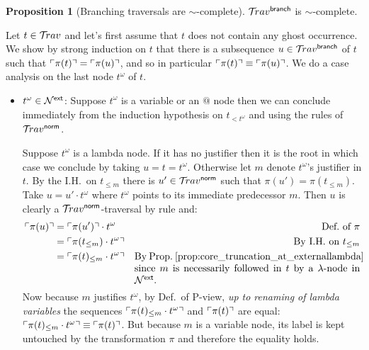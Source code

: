 \documentclass{article}
\theoremstyle{definition}
\newtheorem{proposition}{Proposition}[section]
\newcommand\Nodes{\mathcal{N}}%
\newcommand{\normalizing}{{\sf norm}}
\newcommand{\branching}{{\sf branch}}
\newcommand{\travsetbr}{{\travset^\branching}}
\newcommand{\travsetnorm}{\travset^\normalizing}
\newcommand{\travulc}{\travset}
\def\coresymbol{\pi} %
\newcommand{\core}[1]{\coresymbol(#1)} %
\newcommand{\ExtNodes}{\Nodes^{\sf ext}}
\begin{document}
\begin{proposition}[Branching traversals are $\sim$-complete]
\label{prop:branching_traversal_simcomplete}
  $\travsetbr$ is  $\sim$-complete.
\end{proposition}
\proofatend
Let $t\in\travulc$ and let's first assume that $t$ does not contain any ghost occurrence. We show by strong induction on $t$ that there is a subsequence $u\in\travsetbr$ of $t$ such that $\pview{\core{t}} = \pview{\core{u}}$, and so in particular
$\pview{\core{t}} \equiv \pview{\core{u}}$.
We do a case analysis on the last node $t^\omega$ of $t$.
\begin{itemize}
\item $t^\omega\in \ExtNodes$: Suppose $t^\omega$ is a variable or an $@$ node then we can conclude immediately from the induction hypothesis on $t_{<t^\omega}$ and using the rules  of $\travsetnorm$.

Suppose $t^\omega$ is a lambda node. If it has no justifier then it is the root in which case we conclude by taking  $u=t=t^\omega$. Otherwise let $m$ denote $t^\omega$'s justifier in $t$. By the I.H.~on $t_{\leq m}$ there is $u' \in \travsetnorm$ such that $\core{u'} = \core{t_{\leq m}}$. Take $u = u' \cdot t^\omega$ where $t^\omega$ points to its immediate predecessor $m$. Then $u$ is clearly a $\travsetnorm$-traversal by rule  and:
\begin{align*}
\pview{\core{u}} &= \pview{\core{u'}} \cdot t^\omega & \mbox{Def.~of $\coresymbol$}\\
 &= \pview{\core{t_{\leq m}} \cdot t^\omega} & \mbox{By I.H.~on $t_{\leq m}$}\\
 &= \pview{\core{t}_{\leq m} \cdot t^\omega} & \parbox[t]{8cm}{By Prop.~\ref{prop:core_truncation_at_externallambda} since $m$ is necessarily followed in $t$ by a $\lambda$-node in $\ExtNodes$.}
\end{align*}
Now because $m$ justifies $t^\omega$, by Def.~of P-view, \emph{up to renaming of lambda variables} the sequences $\pview{\core{t}_{\leq m} \cdot t^\omega}$ and $\pview{\core{t}}$ are equal: $\pview{\core{t}_{\leq m} \cdot t^\omega} \equiv \pview{\core{t}}$.
 But because $m$ is a variable node, its label is kept untouched by the transformation $\coresymbol$ and therefore the equality holds.


\end{itemize}
\end{document}
